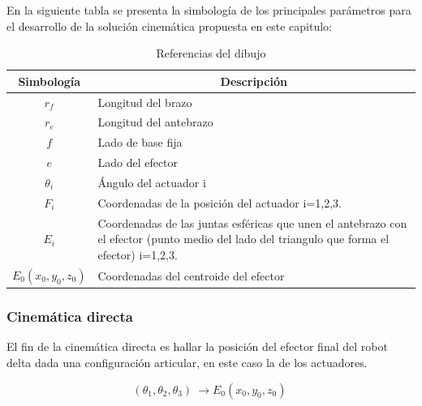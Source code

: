        En la siguiente tabla se presenta la simbología de los principales parámetros para el desarrollo de la solución cinemática propuesta en este capitulo: 
        
        \begingroup
            \renewcommand{\arraystretch}{1.5}
            \begin{table}[H]
            \centering
            \begin{tabular}{c m{12cm}}
               \hline
               \textbf{Simbología}  & \multicolumn{1}{c|}{\textbf{Descripción}}  \\\hline\hline
               $r_{f}$  & Longitud del brazo                                    \\\hline
               $r_{e}$  & Longitud del antebrazo                                \\\hline               
               $f$  & Lado de base fija                                         \\\hline
               $e$  & Lado del efector                                          \\\hline
               $\theta_{i}$  & Ángulo del actuador i    \\\hline
               $F_{i}$  & Coordenadas de la posición del actuador i=1,2,3.    \\\hline
               $E_{i}$  & Coordenadas de las juntas esféricas que unen el antebrazo con el efector (punto medio del lado
               del triangulo que forma el efector) i=1,2,3.    \\\hline
               $E_{0}(x_{0},y_{0},z_{0})$  & Coordenadas del centroide del efector   \\\hline               
            \end{tabular}
            \caption{Referencias del dibujo}
            \label{tab:cap4_tabla_2}
        \end{table}
        \endgroup
        
        
        
        
        \newpage

    
        \subsubsection{Cinemática directa} \label{ma_cd}
        El fin de la cinemática directa es hallar la posición del efector final del robot delta dada una configuración articular, en este caso la de los actuadores.

        \begin{equation}
            \left({\theta }_1,{\theta }_2,{\theta }_3\right)\ \to E_0(x_0,y_0,z_0)\
        \end{equation}

